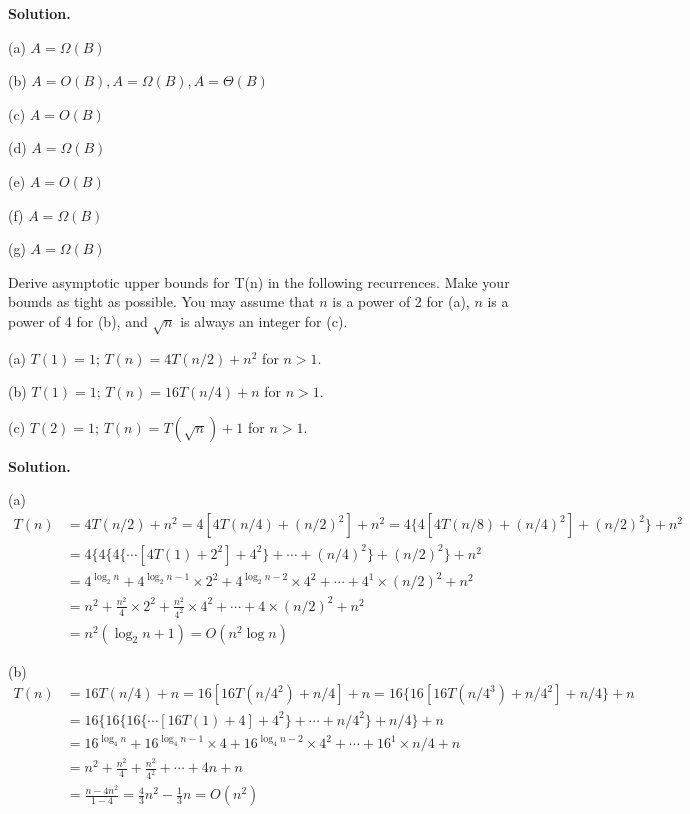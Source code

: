 \documentclass[10pt]{article}
\begin{document}
\textbf{Solution.}
	
	(a) $A = \Omega(B)$
	
	(b) $A = O(B), A = \Omega(B), A = \Theta(B)$
	
	(c) $A = O(B)$
	
	(d) $A = \Omega(B)$
	
	(e) $A = O(B)$
	
	(f) $A = \Omega(B)$
	
	(g) $A = \Omega(B)$

\newpage

\begin{Problem}
	
	Derive asymptotic upper bounds for T(n) in the following recurrences. Make your bounds as tight as possible. You may assume that $n$ is a power of 2 for (a), $n$ is a power of 4 for (b), and $\sqrt{n}$ is always an integer for (c).
	
	\noindent (a) $T(1) = 1$; $T(n) = 4T(n/2) + n^2$ for $n>1$.
	
	\noindent (b) $T(1) = 1$; $T(n) = 16T(n/4) + n$ for $n>1$.
	
	\noindent (c) $T(2) = 1$; $T(n) = T(\sqrt{n}) + 1$ for $n>1$.
	
\end{Problem}

\textbf{Solution.}

(a)
$$
\begin{aligned}
	T(n) &= 4T(n/2) + n^2 = 4[4T(n/4) + (n/2)^2] + n^2 = 4\{4[4T(n/8) + (n/4)^2] + (n/2)^2\} + n^2\\
	&= 4\{4\{4\{\cdots [4T(1) + 2^2] + 4^2\} + \cdots + (n/4)^2\} + (n/2)^2\} + n^2\\
	&= 4^{\log_2 n} + 4^{\log_2 n - 1} \times 2^2 + 4^{\log_2 n - 2} \times 4^2 + \cdots + 4^{1} \times (n/2)^2 + n^2\\
	&= n^2 + \frac{n^2}{4} \times 2^2 + \frac{n^2}{4^2} \times 4^2 + \cdots + 4 \times (n/2)^2 + n^2\\
	&= n^2 (\log_2 n + 1) = O(n^2\log n)
\end{aligned}
$$

(b)
$$
\begin{aligned}
	T(n) &= 16T(n/4) + n = 16[16T(n/4^2) + n/4] + n = 16\{16[16T(n/4^3) + n/4^2] + n/4\} + n\\
	&= 16\{16\{16\{\cdots [16T(1) + 4] + 4^2\} + \cdots + n/4^2\} + n/4\} + n\\
	&= 16^{\log_4 n} + 16^{\log_4 n - 1} \times 4 + 16^{\log_4 n - 2} \times 4^2 + \cdots + 16^{1} \times n/4 + n\\
	&= n^2 + \frac{n^2}{4} + \frac{n^2}{4^2} + \cdots + 4n + n\\
	&= \frac{n-4n^2}{1-4} = \frac{4}{3} n^2 -\frac{1}{3} n = O(n^2)
\end{aligned}
$$
\end{document}

